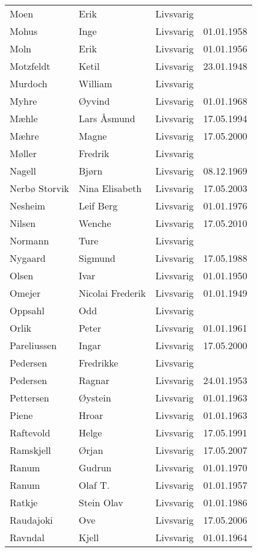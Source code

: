 \begin{longtable}{llll}
Moen	&	Erik	&	Livsvarig 	&		\\
Mohus	&	Inge	&	Livsvarig 	&	01.01.1958	\\
Moln	&	Erik	&	Livsvarig 	&	01.01.1956	\\
Motzfeldt	&	Ketil	&	Livsvarig 	&	23.01.1948	\\
Murdoch	&	William	&	Livsvarig 	&		\\
Myhre	&	Øyvind	&	Livsvarig 	&	01.01.1968	\\
Mæhle	&	Lars Åsmund	&	Livsvarig 	&	17.05.1994	\\
Mæhre	&	Magne	&	Livsvarig	&	17.05.2000	\\
Møller	&	Fredrik	&	Livsvarig 	&		\\
Nagell	&	Bjørn	&	Livsvarig 	&	08.12.1969	\\
Nerbø Storvik 	&	Nina Elisabeth	&	Livsvarig	&	17.05.2003	\\
Nesheim	&	Leif Berg	&	Livsvarig 	&	01.01.1976	\\
Nilsen	&	Wenche	&	Livsvarig	&	17.05.2010	\\
Normann	&	Ture	&	Livsvarig 	&		\\
Nygaard	&	Sigmund	&	Livsvarig 	&	17.05.1988	\\
Olsen	&	Ivar	&	Livsvarig 	&	01.01.1950	\\
Omejer	&	Nicolai Frederik	&	Livsvarig 	&	01.01.1949	\\
Oppsahl	&	Odd	&	Livsvarig 	&		\\
Orlik	&	Peter	&	Livsvarig 	&	01.01.1961	\\
Pareliussen	&	Ingar	&	Livsvarig	&	17.05.2000	\\
Pedersen	&	Fredrikke	&	Livsvarig 	&		\\
Pedersen	&	Ragnar	&	Livsvarig 	&	24.01.1953	\\
Pettersen	&	Øystein	&	Livsvarig 	&	01.01.1963	\\
Piene	&	Hroar	&	Livsvarig 	&	01.01.1963	\\
Raftevold	&	Helge	&	Livsvarig 	&	17.05.1991	\\
Ramskjell	&	Ørjan	&	Livsvarig	&	17.05.2007	\\
Ranum	&	Gudrun	&	Livsvarig 	&	01.01.1970	\\
Ranum	&	Olaf T.	&	Livsvarig 	&	01.01.1957	\\
Ratkje	&	Stein Olav	&	Livsvarig 	&	01.01.1986	\\
Raudajoki	&	Ove	&	Livsvarig	&	17.05.2006	\\
Ravndal	&	Kjell	&	Livsvarig 	&	01.01.1964	\\

\end{longtable}
